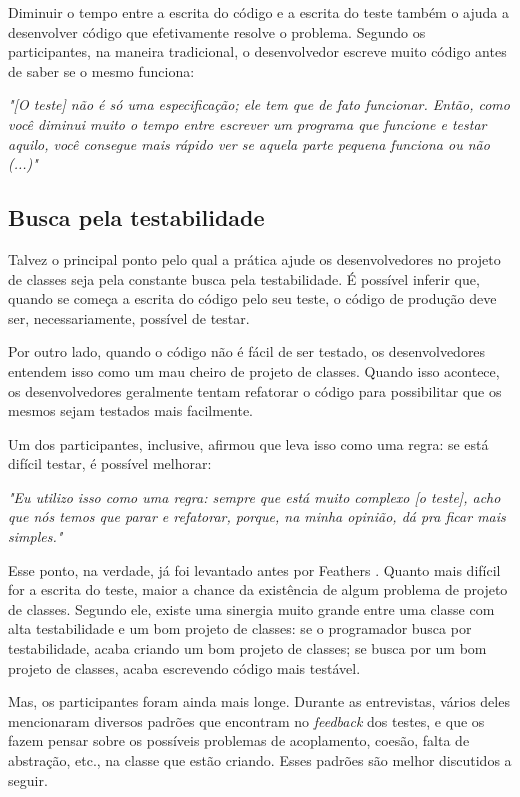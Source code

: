 \documentclass[conference]{IEEEtran}
\begin{document}
Diminuir o tempo entre a escrita do código e a escrita do teste também o ajuda a desenvolver código
que efetivamente resolve o problema. Segundo os participantes, na maneira tradicional, 
o desenvolvedor escreve muito código antes de saber se o mesmo funciona:

\begin{framed}
\textit{"[O teste] não é só uma especificação; ele tem que de fato funcionar. Então,
como você diminui muito o tempo entre escrever um programa que funcione e testar aquilo,
você consegue mais rápido ver se aquela parte pequena funciona ou não (...)"}
\end{framed}

\subsection{Busca pela testabilidade}

Talvez o principal ponto pelo qual a prática ajude os desenvolvedores no projeto de classes 
seja pela constante busca pela testabilidade. É possível inferir que, quando se 
começa a escrita do código pelo seu teste, o código de produção deve ser, necessariamente,
possível de testar.

Por outro lado, quando o código não é fácil de ser testado, os desenvolvedores
entendem isso como um mau cheiro de projeto de classes. Quando isso acontece,
os desenvolvedores geralmente tentam refatorar o código para possibilitar que
os mesmos sejam testados mais facilmente.

Um dos participantes, inclusive, afirmou que leva isso como uma regra:
se está difícil testar, é possível melhorar:

\begin{framed}
\textit{"Eu utilizo isso como uma regra: sempre que está muito complexo [o teste],
acho que nós temos que parar e refatorar, porque, na minha opinião, dá
pra ficar mais simples."}
\end{framed}

Esse ponto, na verdade, já foi levantado antes por Feathers \cite{feathers-synergy}.
Quanto mais difícil for a escrita do teste, maior a chance da existência de
algum problema de projeto de classes. Segundo ele, 
existe uma sinergia muito grande entre uma classe com alta testabilidade e um bom projeto de classes: 
se o programador busca por testabilidade, acaba criando um bom projeto de classes; se 
busca por um bom projeto de classes, acaba escrevendo código mais
testável.

Mas, os participantes foram ainda mais longe. Durante as entrevistas,
vários deles mencionaram diversos padrões que encontram no \textit{feedback} dos testes,
e que os fazem pensar sobre os possíveis problemas de acoplamento,
coesão, falta de abstração, etc., na classe que estão criando.
Esses padrões são melhor discutidos a seguir.
\end{document}
